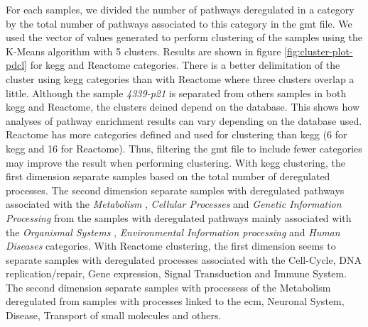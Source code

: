 For each samples, we divided the number of pathways deregulated in a category by the total number of pathways associated to this category in the \acrshort{gmt} file.
We used the vector of values generated to perform clustering of the samples using the K-Means algorithm with 5 clusters.
Results are shown in figure \ref*{fig:cluster-plot-pdcl} for \acrshort{kegg} and Reactome categories.
There is a better delimitation of the cluster using \acrshort{kegg} categories than with Reactome where three clusters overlap a little.
Although the sample \textit{4339-p21} is separated from others samples in both \acrshort{kegg} and Reactome, the clusters deined depend on the database.
This shows how analyses of pathway enrichment results can vary depending on the database used.
Reactome has more categories defined and used for clustering than \acrshort{kegg} (6 for \acrshort{kegg} and 16 for Reactome).
Thus, filtering the \acrshort{gmt} file to include fewer categories may improve the result when performing clustering.
With \acrshort{kegg} clustering, the first dimension separate samples based on the total number of deregulated processes.
The second dimension separate samples with deregulated pathways associated with the \textit{ Metabolism }, \textit{ Cellular Processes} and \textit{Genetic Information Processing} from the samples with deregulated pathways mainly associated with the \textit{ Organismal Systems }, \textit{Environmental Information processing} and \textit{Human Diseases} categories.
With Reactome clustering, the first dimension seems to separate samples with deregulated processes associated with the Cell-Cycle, DNA replication/repair, Gene expression, Signal Transduction and Immune System.
The second dimension separate samples with processess of the Metabolism deregulated from samples with processes linked to the \acrshort{ecm}, Neuronal System, Disease, Transport of small molecules and others.